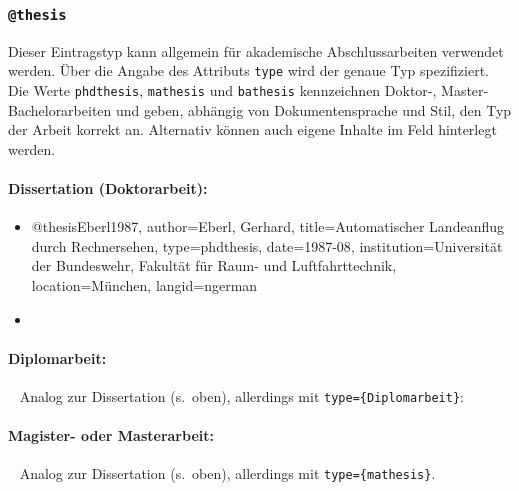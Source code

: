 
\subsubsection{\texttt{\bfseries @thesis}}
\label{sec:@thesis}

Dieser Eintragstyp kann allgemein für akademische Abschlussarbeiten verwendet
werden. Über die Angabe des Attributs \texttt{type} wird der genaue Typ
spezifiziert. Die Werte \texttt{phdthesis}, \texttt{mathesis} und
\texttt{bathesis} kennzeichnen Doktor-, Master- \bzw Bachelorarbeiten und
geben, abhängig von Dokumentensprache und Stil, den Typ der Arbeit korrekt an.
Alternativ können auch eigene Inhalte im Feld hinterlegt werden.

\paragraph{Dissertation (Doktorarbeit):}
%
\begin{itemize}
\item[]
\begin{GenericCode}[numbers=none]
@thesis{Eberl1987,
  author={Eberl, Gerhard},
  title={Automatischer Landeanflug durch Rechnersehen},
  type={phdthesis},
  date={1987-08},
  institution={Universität der Bundeswehr, Fakultät für Raum- und Luftfahrttechnik},
  location={München},
  langid={ngerman}
}
\end{GenericCode}
\item[\cite{Eberl1987}] 
\end{itemize}

\paragraph{Diplomarbeit:} ~ \newline
Analog zur Dissertation (s.\ oben), allerdings mit
\texttt{type=\obnh\{Diplomarbeit\}}:%


\paragraph{Magister- oder Masterarbeit:} ~ \newline
Analog zur Dissertation (s.\ oben), allerdings mit \texttt{type=\{mathesis\}}.%

